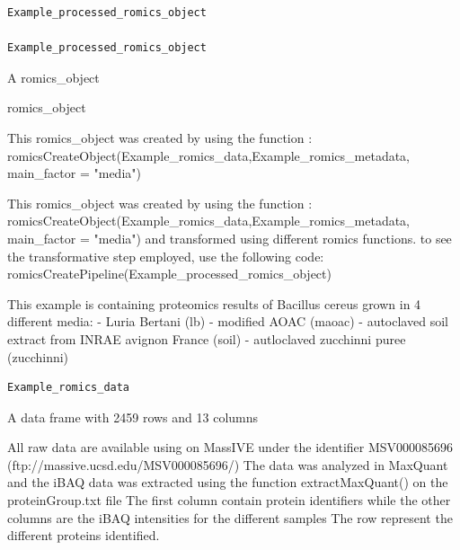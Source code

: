 \documentclass[a4paper]{book}
\begin{document}
%
\begin{Usage}
\begin{verbatim}
Example_processed_romics_object

Example_processed_romics_object
\end{verbatim}
\end{Usage}
%
\begin{Format}
A romics\_object

romics\_object
\end{Format}
%
\begin{Details}
This romics\_object was created by using the function :
romicsCreateObject(Example\_romics\_data,Example\_romics\_metadata, main\_factor = "media")

This romics\_object was created by using the function :
romicsCreateObject(Example\_romics\_data,Example\_romics\_metadata, main\_factor = "media")
and transformed using different romics functions.
to see the transformative step employed, use the following code:
romicsCreatePipeline(Example\_processed\_romics\_object)
\end{Details}
%
\begin{Description}
This example is containing proteomics results of Bacillus cereus grown in 4 different media:
- Luria Bertani (lb)
- modified AOAC (maoac)
- autoclaved soil extract from INRAE avignon France (soil)
- autloclaved zucchinni puree (zucchinni)
\end{Description}
%
\begin{Usage}
\begin{verbatim}
Example_romics_data
\end{verbatim}
\end{Usage}
%
\begin{Format}
A data frame with 2459 rows and 13 columns
\end{Format}
%
\begin{Details}
All raw data are available using on MassIVE under the identifier MSV000085696 (ftp://massive.ucsd.edu/MSV000085696/)
The data was analyzed in MaxQuant and the iBAQ data was extracted using the function extractMaxQuant() on the proteinGroup.txt file
The first column contain protein identifiers while the other columns are the iBAQ intensities for the different samples
The row represent the different proteins identified.
\end{Details}
\end{document}
